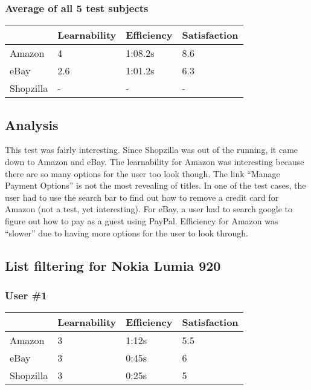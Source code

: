 \documentclass[11pt, oneside]{article}
\begin{document}
\subsubsection{Average of all 5 test subjects}

\begin{center}
\begin{tabular}{| l | l | l | l |}
    \hline
     & Learnability & Efficiency & Satisfaction \\ \hline
    Amazon & 4 & 1:08.2s & 8.6 \\ \hline
    eBay & 2.6 & 1:01.2s & 6.3 \\ \hline
    Shopzilla & - & - & - \\\hline
\end{tabular}
\end{center}

\subsection{Analysis}

This test was fairly interesting. Since Shopzilla was out of the running, it came down to Amazon and eBay. The learnability for Amazon was interesting because there are so many options for the user too look though. The link ``Manage Payment Options'' is not the most revealing of titles. In one of the test cases, the user had to use the search bar to find out how to remove a credit card for Amazon (not a test, yet interesting). For eBay, a user had to search google to figure out how to pay as a guest using PayPal.  Efficiency for Amazon was ``slower'' due to having more options for the user to look through.

\subsection{List filtering for Nokia Lumia 920}

\subsubsection{User \#1}

\begin{center}
\begin{tabular}{| l | l | l | l |}
    \hline
     & Learnability & Efficiency & Satisfaction \\ \hline
    Amazon & 3 & 1:12s & 5.5 \\ \hline
    eBay & 3 & 0:45s & 6 \\ \hline
    Shopzilla & 3 & 0:25s & 5 \\\hline
\end{tabular}
\end{center}
\end{document}

